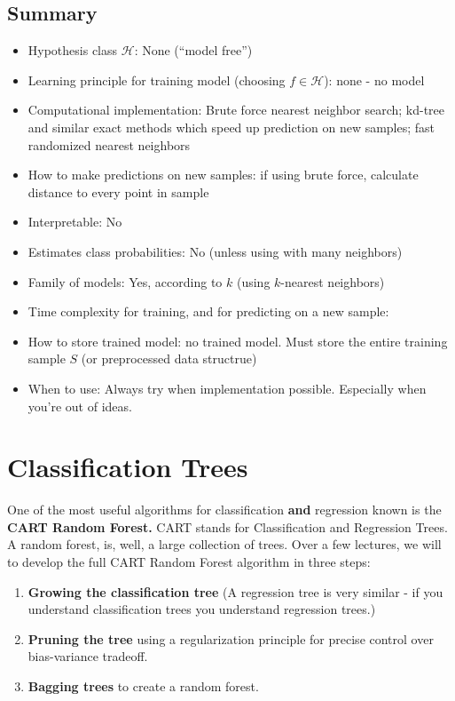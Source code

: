 \documentclass[11pt]{article}
\newcommand{\Hc}{\mathcal{H}}
\begin{document}
\subsection{Summary}
\begin{itemize}
  \item Hypothesis class $\Hc$: None (``model free'')
  \item Learning principle for training model (choosing $f\in\Hc$): none - no model
  \item Computational implementation:
    Brute force nearest neighbor search; 
    kd-tree and similar exact methods which speed up prediction on new samples; 
    fast randomized nearest neighbors 
  \item How to make predictions on new samples: if using brute force, calculate
    distance to every point in sample 
  \item Interpretable: No
    \item Estimates class probabilities: No (unless using with many neighbors)
    \item Family of models: Yes, according to $k$ (using $k$-nearest neighbors)
     \item Time complexity for training, and for predicting on a new sample:
     \item How to store trained model: no trained model. Must store the entire
       training sample $S$ (or preprocessed data structrue)
     \item When to use: Always try when implementation possible. Especially when you're out of ideas.
\end{itemize}


\section{Classification Trees}
 

One of the most useful algorithms for classification {\bf and} regression known is the {\bf CART Random
Forest.} CART stands for Classification and Regression Trees. A random forest,
is, well, a large collection of trees. 
Over a few lectures, we will to develop the full CART Random
Forest algorithm in three steps:
\begin{enumerate}
  \item {\bf Growing the classification tree} (A regression tree is very similar
    - if you understand classification trees you understand regression trees.)
  \item {\bf Pruning the tree} using a regularization principle for precise control
    over bias-variance tradeoff.
  \item {\bf Bagging trees} to create a random forest.
  \end{enumerate}
\end{document}
